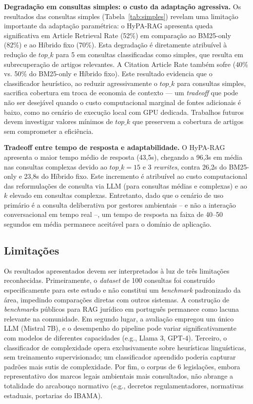 \documentclass[12pt]{article}
\begin{document}
\textbf{Degradação em consultas simples: o custo da adaptação agressiva.} Os resultados das consultas simples (Tabela~\ref{tab:simples}) revelam uma limitação importante da adaptação paramétrica: o HyPA-RAG apresenta queda significativa em Article Retrieval Rate (52\%) em comparação ao BM25-only (82\%) e ao Híbrido fixo (70\%). Esta degradação é diretamente atribuível à redução de $top\_k$ para 5 em consultas classificadas como simples, que resulta em subrecuperação de artigos relevantes. A Citation Article Rate também sofre (40\% vs. 50\% do BM25-only e Híbrido fixo). Este resultado evidencia que o classificador heurístico, ao reduzir agressivamente o $top\_k$ para consultas simples, sacrifica cobertura em troca de economia de contexto --- um \textit{tradeoff} que pode não ser desejável quando o custo computacional marginal de fontes adicionais é baixo, como no cenário de execução local com GPU dedicada. Trabalhos futuros devem investigar valores mínimos de $top\_k$ que preservem a cobertura de artigos sem comprometer a eficiência.

\textbf{Tradeoff entre tempo de resposta e adaptabilidade.} O HyPA-RAG apresenta o maior tempo médio de resposta (43,5s), chegando a 96,3s em média nas consultas complexas devido ao $top\_k = 15$ e 3 \textit{rewrites}, contra 26,2s do BM25-only e 23,8s do Híbrido fixo. Este incremento é atribuível ao custo computacional das reformulações de consulta via LLM (para consultas médias e complexas) e ao $k$ elevado em consultas complexas. Entretanto, dado que o cenário de uso primário é a consulta deliberativa por gestores ambientais -- e não a interação conversacional em tempo real --, um tempo de resposta na faixa de 40--50 segundos em média permanece aceitável para o domínio de aplicação.

\subsection{Limitações}

Os resultados apresentados devem ser interpretados à luz de três limitações reconhecidas. Primeiramente, o \textit{dataset} de 100 consultas foi construído especificamente para este estudo e não constitui um \textit{benchmark} padronizado da área, impedindo comparações diretas com outros sistemas. A construção de \textit{benchmarks} públicos para RAG jurídico em português permanece como lacuna relevante na comunidade. Em segundo lugar, a avaliação empregou um único LLM (Mistral 7B), e o desempenho do pipeline pode variar significativamente com modelos de diferentes capacidades (e.g., Llama 3, GPT-4). Terceiro, o classificador de complexidade opera exclusivamente sobre heurísticas linguísticas, sem treinamento supervisionado; um classificador aprendido poderia capturar padrões mais sutis de complexidade. Por fim, o corpus de 6 legislações, embora representativo dos marcos legais ambientais mais consultados, não abrange a totalidade do arcabouço normativo (e.g., decretos regulamentadores, normativas estaduais, portarias do IBAMA).
\end{document}
